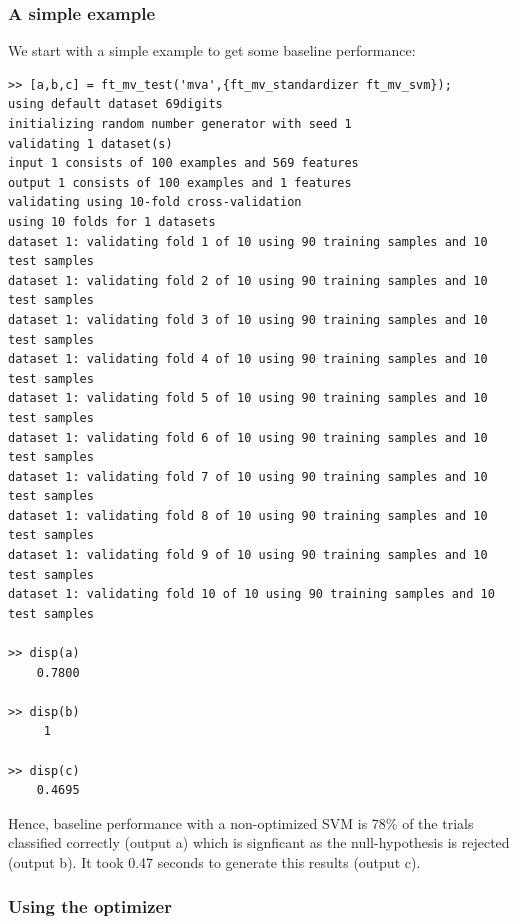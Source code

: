 \documentclass{article}
\begin{document}
\subsubsection*{A simple example}
We start with a simple example to get some baseline performance:
\begin{verbatim}
>> [a,b,c] = ft_mv_test('mva',{ft_mv_standardizer ft_mv_svm});
using default dataset 69digits
initializing random number generator with seed 1
validating 1 dataset(s)
input 1 consists of 100 examples and 569 features
output 1 consists of 100 examples and 1 features
validating using 10-fold cross-validation
using 10 folds for 1 datasets
dataset 1: validating fold 1 of 10 using 90 training samples and 10 test samples
dataset 1: validating fold 2 of 10 using 90 training samples and 10 test samples
dataset 1: validating fold 3 of 10 using 90 training samples and 10 test samples
dataset 1: validating fold 4 of 10 using 90 training samples and 10 test samples
dataset 1: validating fold 5 of 10 using 90 training samples and 10 test samples
dataset 1: validating fold 6 of 10 using 90 training samples and 10 test samples
dataset 1: validating fold 7 of 10 using 90 training samples and 10 test samples
dataset 1: validating fold 8 of 10 using 90 training samples and 10 test samples
dataset 1: validating fold 9 of 10 using 90 training samples and 10 test samples
dataset 1: validating fold 10 of 10 using 90 training samples and 10 test samples

>> disp(a)
    0.7800

>> disp(b)
     1

>> disp(c)
    0.4695    
\end{verbatim}
Hence, baseline performance with a non-optimized SVM is 78\% of the trials classified correctly (output a) which is signficant as the null-hypothesis is rejected (output b). It took 0.47 seconds to generate this results (output c).

\subsubsection*{Using the optimizer}
\end{document}
